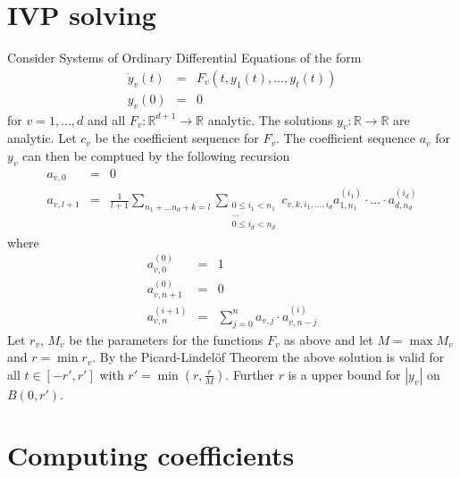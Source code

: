 \documentclass[]{article}
\newcommand{\RR}{\mathbb R}
\newcommand{\abs}[1]{\left|#1\right|}
\begin{document}
\section{IVP solving}
Consider Systems of Ordinary Differential Equations of the form
\begin{eqnarray*}
  \dot y_v(t) &=& F_v(t, y_1(t), \dots, y_t(t)) \\
  y_v(0) &=& 0 
\end{eqnarray*}
for $v=1,\dots,d$ and all $F_v : \RR^{d+1} \to \RR$ analytic.
The solutions $y_v : \RR \to \RR$ are analytic.
Let $c_v$ be the coefficient sequence for $F_v$.
The coefficient sequence $a_v$ for $y_v$ can then be comptued by the following recursion
\begin{eqnarray*}
  a_{v,0} &=& 0 \\
  a_{v, l+1} &=& \frac{1}{l+1} \sum_{n_1+\dots n_d + k = l} \sum_{\substack {0 \leq i_1 < n_1 \\ \dots\\ 0 \leq i_d < n_d}} c_{v,k,i_1,\dots,i_d} a_{1,n_1}^{(i_1)}\cdot \dots \cdot a_{d, n_d}^{(i_d)}
\end{eqnarray*}
where
\begin{eqnarray*}
 a^{(0)}_{v,0} & = & 1 \\
 a^{(0)}_{v,n+1} & = & 0 \\
 a^{(i+1)}_{v,n} & = & \sum_{j=0}^n a_{v,j} \cdot a_{v, n-j}^{(i)}
\end{eqnarray*}
Let $r_v$, $M_v$ be the parameters for the functions $F_v$ as above and let $M = \max M_v$ and $r = \min r_v$.
By the Picard-Lindel\"{o}f Theorem the above solution is valid for all $t \in [-r', r']$ with $r' = \min(r, \frac{r}{M})$.
Further $r$ is a upper bound for $\abs{y_v}$ on $B(0, r')$. 
\section{Computing coefficients}
\end{document}
